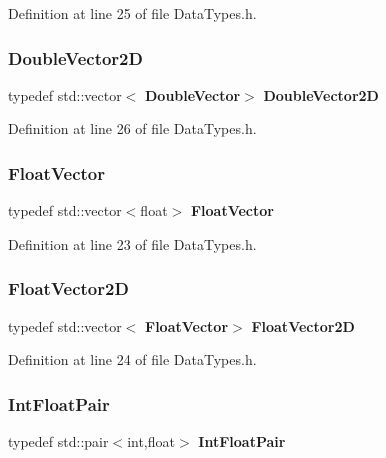 Definition at line 25 of file Data\+Types.\+h.

\mbox{\label{_data_types_8h_a7e70d37182fdafec492c4dd396c9698c}} 
\subsubsection{Double\+Vector2D}
{\footnotesize\ttfamily typedef std\+::vector$<$\textbf{ Double\+Vector}$>$ \textbf{ Double\+Vector2D}}



Definition at line 26 of file Data\+Types.\+h.

\mbox{\label{_data_types_8h_a64be07a13efb96ba9d376c4cbc6f501e}} 
\subsubsection{Float\+Vector}
{\footnotesize\ttfamily typedef std\+::vector$<$float$>$ \textbf{ Float\+Vector}}



Definition at line 23 of file Data\+Types.\+h.

\mbox{\label{_data_types_8h_a90fed7f97f1803c7719d26e6f21b4de6}} 
\subsubsection{Float\+Vector2D}
{\footnotesize\ttfamily typedef std\+::vector$<$\textbf{ Float\+Vector}$>$ \textbf{ Float\+Vector2D}}



Definition at line 24 of file Data\+Types.\+h.

\mbox{\label{_data_types_8h_a3d5049745a50e0c457cb380125e045dc}} 
\subsubsection{Int\+Float\+Pair}
{\footnotesize\ttfamily typedef std\+::pair$<$int,float$>$ \textbf{ Int\+Float\+Pair}}



